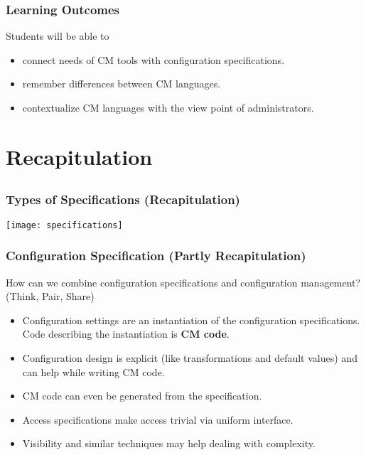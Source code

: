 \begin{frame}
	\frametitle{Learning Outcomes}
	Students will be able to
	\begin{itemize}
	\item connect needs of CM tools with configuration specifications.
	\item remember differences between CM languages.
	\item contextualize CM languages with the view point of administrators.
	\end{itemize}
\end{frame}


\section{Recapitulation}

\subsection{}

\begin{frame}
	\frametitle{Types of Specifications (Recapitulation)}

	\texttt{[image: specifications]}
\end{frame}


\begin{frame}
	\frametitle{Configuration Specification (Partly Recapitulation)}

	\begin{task}
	How can we combine configuration specifications and configuration management?
	(Think, Pair, Share)
	\end{task}

	\pause

	\begin{itemize}[<+-| alert@+>]
	\item Configuration settings are an instantiation of the configuration specifications. \\
		Code describing the instantiation is \textbf{CM code}.
	\item Configuration design is explicit (like transformations and default values) and can help while writing CM code.
	\item CM code can even be generated from the specification.
	\item Access specifications make access trivial via uniform interface.
	\item Visibility and similar techniques may help dealing with complexity.
	\end{itemize}
\end{frame}

